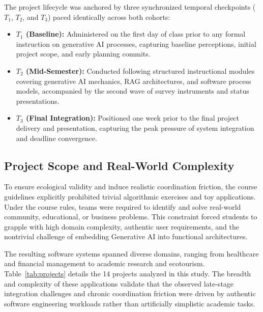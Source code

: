 The project lifecycle was anchored by three synchronized temporal checkpoints ($T_1$, $T_2$, and $T_3$) paced identically across both cohorts:
\begin{itemize}
	\item \textbf{$T_1$ (Baseline):} Administered on the first day of class prior to any formal instruction on generative AI processes, capturing baseline perceptions, initial project scope, and early planning commits.
	\item \textbf{$T_2$ (Mid-Semester):} Conducted following structured instructional modules covering generative AI mechanics, RAG architectures, and software process models, accompanied by the second wave of survey instruments and status presentations.
	\item \textbf{$T_3$ (Final Integration):} Positioned one week prior to the final project delivery and presentation, capturing the peak pressure of system integration and deadline convergence.
\end{itemize}

\subsection{Project Scope and Real-World Complexity}
To ensure ecological validity and induce realistic coordination friction, the course guidelines explicitly prohibited trivial algorithmic exercises and toy applications. Under the course rules, teams were required to identify and solve real-world community, educational, or business problems. This constraint forced students to grapple with high domain complexity, authentic user requirements, and the nontrivial challenge of embedding Generative AI into functional architectures.

The resulting software systems spanned diverse domains, ranging from healthcare and financial management to academic research and ecotourism. Table~\ref{tab:projects} details the 14 projects analyzed in this study. The breadth and complexity of these applications validate that the observed late-stage integration challenges and chronic coordination friction were driven by authentic software engineering workloads rather than artificially simplistic academic tasks.

